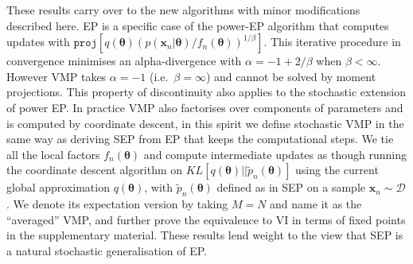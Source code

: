 These results carry over to the new algorithms with minor modifications described here. EP is a specific case of the power-EP algorithm \cite{minka:powerep} that computes updates with $\mathtt{proj}[q(\bm{\theta}) (p(\bm{x}_n|\bm{\theta}) / f_n(\bm{\bm{\theta}}))^{1/\beta}]$. This iterative procedure in convergence minimises an alpha-divergence \cite{amari:ig1985} with $\alpha = -1 + 2 / \beta$ when $\beta < \infty$. However VMP takes $\alpha = -1$ (i.e.~$\beta = \infty$) and cannot be solved by moment projections. This property of discontinuity also applies to the stochastic extension of power EP. In practice VMP also factorises over components of parameters and is computed by coordinate descent, in this spirit we define stochastic VMP in the same way as deriving SEP from EP that keeps the computational steps. We tie all the local factors $f_n(\bm{\theta})$ and compute intermediate updates as though running the coordinate descent algorithm on $KL[q(\bm{\theta}) || \tilde{p}_n(\bm{\theta})]$ using the current global approximation $q(\bm{\theta})$, with $\tilde{p}_n(\bm{\theta})$ defined as in SEP on a sample $\bm{x}_n \sim \mathcal{D}$.
% 
We denote its expectation version by taking $M=N$ and name it as the ``averaged'' VMP, and further prove the equivalence to VI in terms of fixed points in the supplementary material. These results lend weight to the view that SEP is a natural stochastic generalisation of EP.


%


